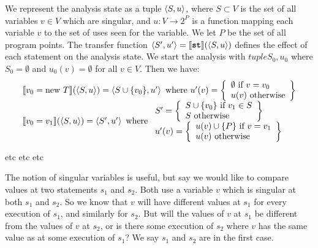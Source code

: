 \documentclass[11pt,notitlepage]{article}
\begin{document}
We represent the analysis state as a tuple $\left\langle S, u \right\rangle$, where $S
\subset V$ is the set of all variables $v \in V$ which are singular,
and $u:V \to 2^P$ is a function mapping each variable $v$ to the set
of uses seen for the variable.  We let $P$ be the set of all program
points.
The transfer function
$\left\langle S',u' \right\rangle =
  \llbracket\text{\texttt{\textbf{st}}}\rrbracket (\left\langle S,u \right\rangle)$
defines the effect of each statement  on the analysis state.
We start the analysis with $tuple{S_0, u_0}$ where $S_0 = \emptyset$
and $u_0(v) = \emptyset$ for all $v \in V$.  Then we have:
\begin{displaymath}
\begin{array}{l}
\llbracket v_0 = \text{new } T \rrbracket (\tuple{S, u}) =
 \tuple{S \cup \{ v_0 \}, u'} \text{ where }
    u'(v) = \left\{\begin{array}{l}
      \emptyset \text{ if } v = v_0 \\
      u(v) \text{ otherwise} \\
    \end{array} \right\} %
\\
\llbracket v_0 = v_1 \rrbracket (\tuple{S, u}) =
 \tuple{S', u'} \text{ where }
   \begin{array}{l}
     S' = \left\{\begin{array}{l}
       S \cup \{ v_0 \} \text{ if } v_1 \in S \\
       S \text{ otherwise } \\
     \end{array} \right\} %
     \\
     u'(v) = \left\{\begin{array}{l}
        u(v) \cup \{ P \} \text{ if } v=v_1 \\
        u(v) \text{ otherwise } \\
     \end{array} \right\} %
   \end{array}
\\

\end{array}
\end{displaymath}

etc etc etc

The notion of singular variables is useful, but say we would like to
compare values at two statements $s_1$ and $s_2$.  Both use a variable
$v$ which is singular at both $s_1$ and $s_2$.  So we know that $v$
will have different values at $s_1$ for every execution of $s_1$, and
similarly for $s_2$.  But will the values of $v$ at $s_1$ be different
from the values of $v$ at $s_2$, or is there some execution of $s_2$
where $v$ has the same value as at some execution of $s_1$?  We say
$s_1$ and $s_2$ are  in the first case.
\end{document}
